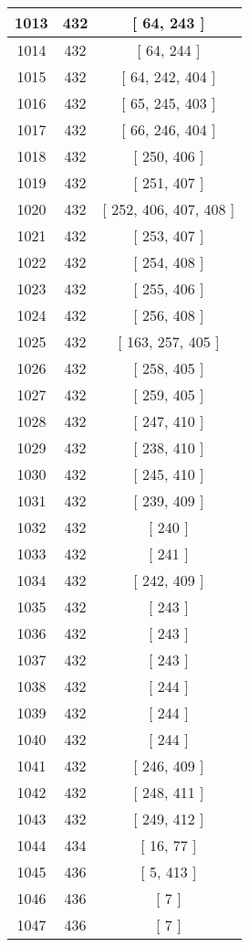 \begin{center}
\begin{longtable}[H]{|| c c c ||}
\hline
1013 & 432 & [ 64, 243 ] \\ 
\hline
1014 & 432 & [ 64, 244 ] \\ 
\hline
1015 & 432 & [ 64, 242, 404 ] \\ 
\hline
1016 & 432 & [ 65, 245, 403 ] \\ 
\hline
1017 & 432 & [ 66, 246, 404 ] \\ 
\hline
1018 & 432 & [ 250, 406 ] \\ 
\hline
1019 & 432 & [ 251, 407 ] \\ 
\hline
1020 & 432 & [ 252, 406, 407, 408 ] \\ 
\hline
1021 & 432 & [ 253, 407 ] \\ 
\hline
1022 & 432 & [ 254, 408 ] \\ 
\hline
1023 & 432 & [ 255, 406 ] \\ 
\hline
1024 & 432 & [ 256, 408 ] \\ 
\hline
1025 & 432 & [ 163, 257, 405 ] \\ 
\hline
1026 & 432 & [ 258, 405 ] \\ 
\hline
1027 & 432 & [ 259, 405 ] \\ 
\hline
1028 & 432 & [ 247, 410 ] \\ 
\hline
1029 & 432 & [ 238, 410 ] \\ 
\hline
1030 & 432 & [ 245, 410 ] \\ 
\hline
1031 & 432 & [ 239, 409 ] \\ 
\hline
1032 & 432 & [ 240 ] \\ 
\hline
1033 & 432 & [ 241 ] \\ 
\hline
1034 & 432 & [ 242, 409 ] \\ 
\hline
1035 & 432 & [ 243 ] \\ 
\hline
1036 & 432 & [ 243 ] \\ 
\hline
1037 & 432 & [ 243 ] \\ 
\hline
1038 & 432 & [ 244 ] \\ 
\hline
1039 & 432 & [ 244 ] \\ 
\hline
1040 & 432 & [ 244 ] \\ 
\hline
1041 & 432 & [ 246, 409 ] \\ 
\hline
1042 & 432 & [ 248, 411 ] \\ 
\hline
1043 & 432 & [ 249, 412 ] \\ 
\hline
1044 & 434 & [ 16, 77 ] \\ 
\hline
1045 & 436 & [ 5, 413 ] \\ 
\hline
1046 & 436 & [ 7 ] \\ 
\hline
1047 & 436 & [ 7 ] \\ 

\end{longtable}
\end{center}
